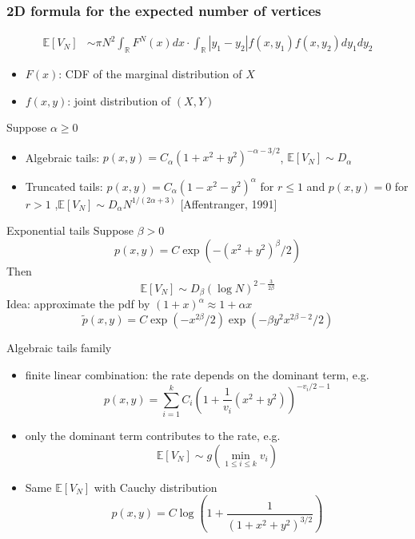 \documentclass{beamer}
\def\E{\mathbb{E}}
\def\R{\mathbb{R}}
\begin{document}
\begin{frame}
    \frametitle{
        2D formula for the expected number of vertices
    }
    \begin{align*}
        \E[V_N]
        & \sim \pi N^2 \int_{\R} F^{N}(x) dx \cdot \int_{\R} |y_1-y_2| f(x, y_1) f(x,y_2)dy_1dy_2
    \end{align*}
    \begin{itemize}
        \item $F(x)$: CDF of the marginal distribution of $X$
        \item $f(x,y)$: joint distribution of $(X,Y)$
    \end{itemize}
    Suppose $\alpha \geq 0$
    \begin{itemize}
        \item Algebraic tails: $p(x,y) = C_{\alpha}(1+x^2+y^2)^{-\alpha-3/2}$,
        $\E[V_N] \sim D_{\alpha}$
        \item Truncated tails: $p(x,y) = C_{\alpha}(1-x^2-y^2)^{\alpha}$ for $r\leq 1$ and $p(x,y)=0$ for $r>1$
        ,$\E[V_N] \sim D_{\alpha} N^{1/(2\alpha + 3)}$ [Affentranger, 1991]
    \end{itemize}
\end{frame}
\begin{frame}{Exponential tails}
    Suppose $\beta > 0$
\begin{equation*}
    p(x,y) = C  \exp(-(x^2+y^2)^{\beta}/2)    
\end{equation*}
Then 
\begin{equation*}
    \E[V_N] \sim D_{\beta} (\log N)^{2-\frac{3}{2\beta}}
\end{equation*}
Idea: approximate the pdf by
$(1+x)^{\alpha} \approx 1+\alpha x$
\begin{equation*}
    \tilde{p}(x,y)=
    C \exp(-x^{2\beta}/2) \exp(-\beta y^2 x^{2\beta-2}/2)
\end{equation*}
\end{frame}
\begin{frame}{Algebraic tails family}
    \begin{itemize}
        \item finite linear combination: the rate depends on the dominant term, e.g.
        \begin{equation*}
            p(x,y) = \sum_{i=1}^k C_i (1+\frac{1}{v_i}(x^2+y^2))^{-v_i/2 - 1}
        \end{equation*}
        \item only the dominant term contributes to the rate, e.g.
        \begin{equation*}
            \E[V_N] \sim g(\min_{1\leq i\leq k} v_i)
        \end{equation*}
        \item Same $\E[V_N]$ with Cauchy distribution
        \begin{equation*}
            p(x,y) = C \log \left(1+\frac{1}{(1+x^2+y^2)^{3/2}} \right)
        \end{equation*}
    \end{itemize}
\end{frame}
\end{document}

